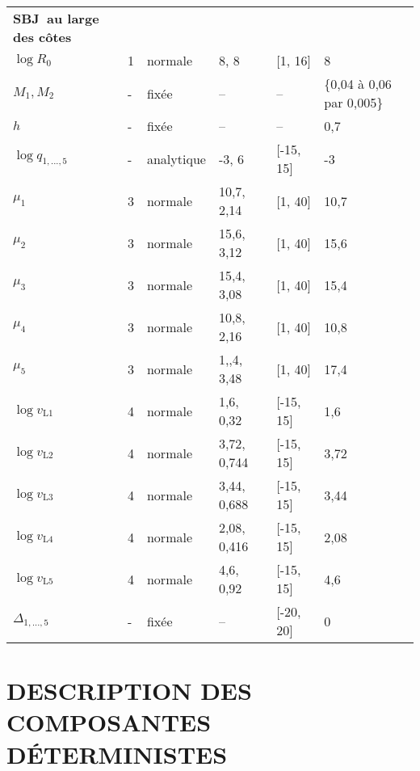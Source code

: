 \documentclass[11pt]{book}
\begin{document}
\begin{longtable}{L{1in}C{1.0in}C{1.0in}C{1.0in}C{1.0in}C{1.4in}}
\textbf{SBJ~au large des c\^{o}tes} &   &          &              &             &\\
$\log R_0$                    & 1 & normale   & 8, 8         & [1, 16]     &  8\\
$M_{1}, M_{2}$                & - & fix\'{e}e    & --           & --          &  {\footnotesize\{0,04 \`{a} 0,06 par 0,005\}}\\
$h$                           & - & fix\'{e}e    & --           & --          &  0,7\\
$\log q_{1,...,5}$            & - & analytique & -3,   6      & [-15, 15]   & -3\\
$\mu_{1}$                     & 3 & normale  & 10,7,  2,14   & [1, 40]     & 10,7\\
$\mu_{2}$                     & 3 & normale  & 15,6,  3,12   & [1, 40]     & 15,6\\
$\mu_{3}$                     & 3 & normale  & 15,4,  3,08   & [1, 40]     & 15,4\\
$\mu_{4}$                     & 3 & normale  & 10,8,  2,16   & [1, 40]     & 10,8\\
$\mu_{5}$                     & 3 & normale  & 1,,4,  3,48   & [1, 40]     & 17,4\\
$\log v_{\text{L}1}$        & 4 & normale  &  1,6,  0,32   & [-15, 15]   &  1,6\\
$\log v_{\text{L}2}$        & 4 & normale  &  3,72, 0,744  & [-15, 15]   &  3,72\\
$\log v_{\text{L}3}$        & 4 & normale  &  3,44, 0,688  & [-15, 15]   &  3,44\\
$\log v_{\text{L}4}$        & 4 & normale  &  2,08, 0,416  & [-15, 15]   &  2,08\\
$\log v_{\text{L}5}$        & 4 & normale  &  4,6,  0,92   & [-15, 15]   &  4,6\\
$\Delta_{1,...,5}$            & - & fix\'{e}e   &  --           & [-20, 20]   &  0\\
\hline
\end{longtable}


\section{DESCRIPTION DES COMPOSANTES D\'{E}TERMINISTES}
\end{document}
